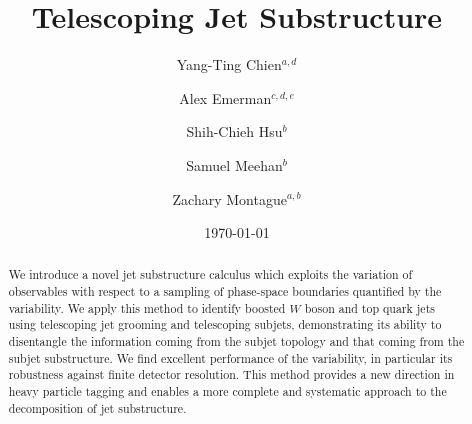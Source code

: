 \documentclass[aps,prl,floatfix,preprintnumbers,twocolumn,groupedaddress,nofootinbib]{revtex4-1}
\begin{document}
\title{Telescoping Jet Substructure}

\author{Yang-Ting Chien$^{a,d}$}

\author{Alex Emerman$^{c,d,e}$}

\author{Shih-Chieh Hsu$^b$}

\author{Samuel Meehan$^b$}

\author{Zachary Montague$^{a,b}$}


\date{\today}
\linenumbers

\begin{abstract}
We introduce a novel jet substructure calculus which exploits the variation of observables with respect to a sampling of phase-space boundaries quantified by the variability. We apply this method to identify boosted $W$ boson and top quark jets using telescoping jet grooming and telescoping subjets, demonstrating its ability to disentangle the information coming from the subjet topology and that coming from the subjet substructure. We find excellent performance of the variability, in particular its robustness against finite detector resolution. This method provides a new direction in heavy particle tagging and enables a more complete and systematic approach to the decomposition of jet substructure.
\end{abstract}
\maketitle
\end{document}
